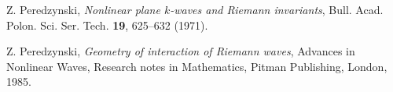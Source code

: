 \documentclass{birkjour}
\theoremstyle{definition}
\theoremstyle{remark}
\numberwithin{equation}{section}
\numberwithin{equation}{section}
\numberwithin{thm}{section}
\numberwithin{equation}{section}
\numberwithin{thm}{section}
\begin{document}
\begin{thebibliography}{10}
	
	
	
	Z. Peredzynski, {\it Nonlinear plane $k$-waves and Riemann invariants}, Bull. Acad.  Polon. Sci. Ser. Tech. {\bf 19}, 625--632 (1971).
	
	Z. Peredzynski, {\sl Geometry of interaction of Riemann waves}, Advances in Nonlinear Waves, Research notes in Mathematics, Pitman Publishing, London, 1985.
	
	
	

\end{thebibliography}
\end{document}
